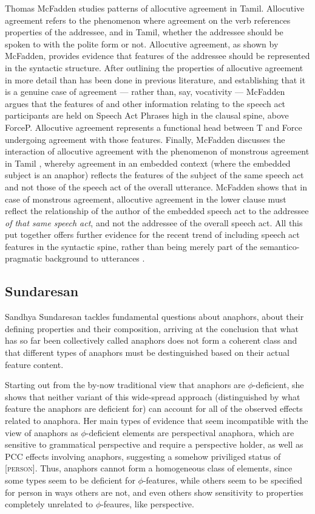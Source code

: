 \documentclass[output=paper
,modfonts
,nonflat]{langsci/langscibook}
\begin{document}
Thomas McFadden studies patterns of allocutive agreement in Tamil.
Allocutive agreement refers to the phenomenon where agreement on the verb references properties of the addressee, and in Tamil, whether the addressee should be spoken to with the polite form or not.
Allocutive agreement, as shown by McFadden, provides evidence that features of the addressee should be represented in the syntactic structure.
After outlining the properties of allocutive agreement in more detail than has been done in previous literature, and establishing that it is a genuine case of agreement --- rather than, say, vocativity --- McFadden argues that the features of and other information relating to the speech act participants are held on Speech Act Phrases high in the clausal spine, above ForceP.
Allocutive agreement represents a functional head between T and Force undergoing agreement with those features.
Finally, McFadden discusses the interaction of allocutive agreement with the phenomenon of monstrous agreement in Tamil \citep{sundaresan2012}, whereby agreement in an embedded context (where the embedded subject is an anaphor) reflects the features of the subject of the same speech act and not those of the speech act of the overall utterance.
McFadden shows that in case of monstrous agreement, allocutive agreement in the lower clause must reflect the relationship of the author of the embedded speech act to the addressee \emph{of that same speech act}, and not the addressee of the overall speech act.
All this put together offers further evidence for the recent trend of including speech act features in the syntactic spine, rather than being merely part of the semantico-pragmatic background to utterances \citep{HaegemanHill2013,zu2015,Miyagawa2017}.

\subsection{Sundaresan}
\label{sec:sundaresan}

Sandhya Sundaresan tackles fundamental questions about anaphors, about their defining properties and their composition, arriving at the conclusion that what has so far been collectively called anaphors does not form a coherent class and that different types of anaphors must be destinguished based on their actual feature content.

Starting out from the by-now traditional view that anaphors are $\phi$-deficient, she shows that neither variant of this wide-spread approach (distinguished by what feature the anaphors are deficient for) can account for all of the observed effects related to anaphora. Her main types of evidence that seem incompatible with the view of anaphors as $\phi$-deficient elements are perspectival anaphora, which are sensitive to grammatical perspective and require a perspective holder, as well as PCC effects involving anaphors, suggesting a somehow priviliged status of [\textsc{person}]. Thus, anaphors cannot form a homogeneous class of elements, since some types seem to be deficient for $\phi$-features, while others seem to be specified for person in ways others are not, and even others show sensitivity to properties completely unrelated to $\phi$-feaures, like perspective.
\end{document}
